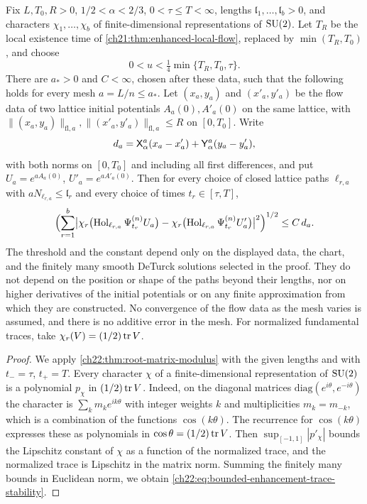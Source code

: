 \begin{corollary}\label{ch22:cor:bounded-input-trace-stability}
Fix $L,T_0,R>0$, $1/2<\alpha<2/3$, $0<\tau\le T<\infty$, lengths $\mathfrak l_1,\ldots,\mathfrak l_b>0$, and characters $\chi_1,\ldots,\chi_b$ of finite-dimensional representations of $\mathrm{SU}(2)$. Let $T_R$ be the local existence time of \cref{ch21:thm:enhanced-local-flow}, replaced by $\min(T_R,T_0)$, and choose
\[
 0<u<\tfrac14\min\{T_R,T_0,\tau\}.
\]
There are $a_*>0$ and $C<\infty$, chosen after these data, such that the following holds for every mesh $a=L/n\le a_*$. Let $(x_a,y_a)$ and $(x'_a,y'_a)$ be the flow data of two lattice initial potentials $A_a(0),A'_a(0)$ on the same lattice, with $\|(x_a,y_a)\|_{\mathrm{fl},a},\|(x'_a,y'_a)\|_{\mathrm{fl},a}\le R$ on $[0,T_0]$. Write
\[
 d_a=\mathsf X_{\alpha}^{a}(x_a-x'_a)+\mathsf Y_{\alpha}^{a}(y_a-y'_a),
\]
with both norms on $[0,T_0]$ and including all first differences, and put $U_a=e^{aA_a(0)}$, $U'_a=e^{aA'_a(0)}$. Then for every choice of closed lattice paths $\ell_{r,a}$ with $aN_{\ell_{r,a}}\le\mathfrak l_r$ and every choice of times $t_r\in[\tau,T]$,
\begin{equation}\label{ch22:eq:bounded-enhancement-trace-stability}
 \Bigl(\sum_{r=1}^b\bigl|\chi_r\bigl(\operatorname{Hol}_{\ell_{r,a}}\Psi_{t_r}^{(n)}U_a\bigr)-\chi_r\bigl(\operatorname{Hol}_{\ell_{r,a}}\Psi_{t_r}^{(n)}U'_a\bigr)\bigr|^2\Bigr)^{1/2}\le C\,d_a .
\end{equation}
The threshold and the constant depend only on the displayed data, the chart, and the finitely many smooth DeTurck solutions selected in the proof. They do not depend on the position or shape of the paths beyond their lengths, nor on higher derivatives of the initial potentials or on any finite approximation from which they are constructed. No convergence of the flow data as the mesh varies is assumed, and there is no additive error in the mesh. For normalized fundamental traces, take $\chi_r(V)=(1/2)\operatorname{tr} V$.
\end{corollary}

\begin{proof}
We apply \cref{ch22:thm:root-matrix-modulus} with the given lengths and with $t_-=\tau$, $t_+=T$. Every character $\chi$ of a finite-dimensional representation of $\mathrm{SU}(2)$ is a polynomial $p_\chi$ in $(1/2)\operatorname{tr} V$. Indeed, on the diagonal matrices $\mathrm{diag}(e^{i\theta},e^{-i\theta})$ the character is $\sum_km_ke^{ik\theta}$ with integer weights $k$ and multiplicities $m_k=m_{-k}$, which is a combination of the functions $\cos(k\theta)$. The recurrence for $\cos(k\theta)$ expresses these as polynomials in $\cos\theta=(1/2)\operatorname{tr} V$. Then $\sup_{[-1,1]}|p'_\chi|$ bounds the Lipschitz constant of $\chi$ as a function of the normalized trace, and the normalized trace is Lipschitz in the matrix norm. Summing the finitely many bounds in Euclidean norm, we obtain \eqref{ch22:eq:bounded-enhancement-trace-stability}.
\end{proof}


